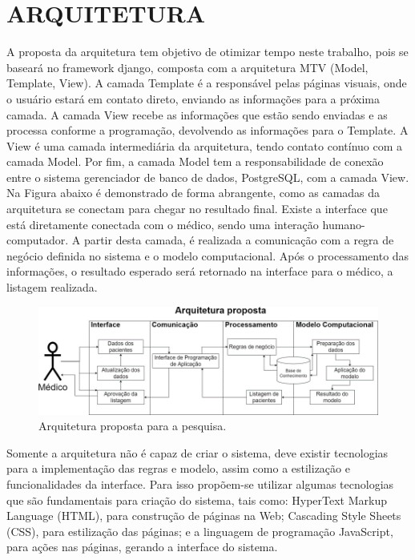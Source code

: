 \documentclass[12pt]{article}
\begin{document}
\section{ARQUITETURA}
A proposta da arquitetura tem objetivo de otimizar tempo neste trabalho, pois se baseará no framework django, composta com a arquitetura MTV (Model, Template, View). A camada Template é a responsável pelas páginas visuais, onde o usuário estará em contato direto, enviando as informações para a próxima camada. A camada View recebe as informações que estão sendo enviadas e as processa conforme a programação, devolvendo as informações para o Template. A View é uma camada intermediária da arquitetura, tendo contato contínuo com a camada Model. Por fim, a camada Model tem a responsabilidade de conexão entre o sistema gerenciador de banco de dados, PostgreSQL, com a camada View.
Na Figura abaixo é demonstrado de forma abrangente, como as camadas da arquitetura se conectam para chegar no resultado final. Existe a interface que está diretamente conectada com o médico, sendo uma interação humano-computador. A partir desta camada, é realizada a comunicação com a regra de negócio definida no sistema e o modelo computacional. Após o processamento das informações, o resultado esperado será retornado na interface para o médico, a listagem realizada.

\begin{figure}[!htb]
    \centering
    \includegraphics[scale=0.9]{img/Arquitetura-MDS.png}
    \centering
    \caption{Arquitetura proposta para a pesquisa.}
    \label{subexpressao}
\end{figure}

Somente a arquitetura não é capaz de criar o sistema, deve existir tecnologias para a implementação das regras e modelo, assim como a estilização e funcionalidades da interface. Para isso propõem-se utilizar algumas tecnologias que são fundamentais para criação do sistema, tais como: HyperText Markup Language (HTML), para construção de páginas na Web; Cascading Style Sheets (CSS), para estilização das páginas; e a linguagem de programação JavaScript, para ações nas páginas, gerando a interface do sistema.
\end{document}
